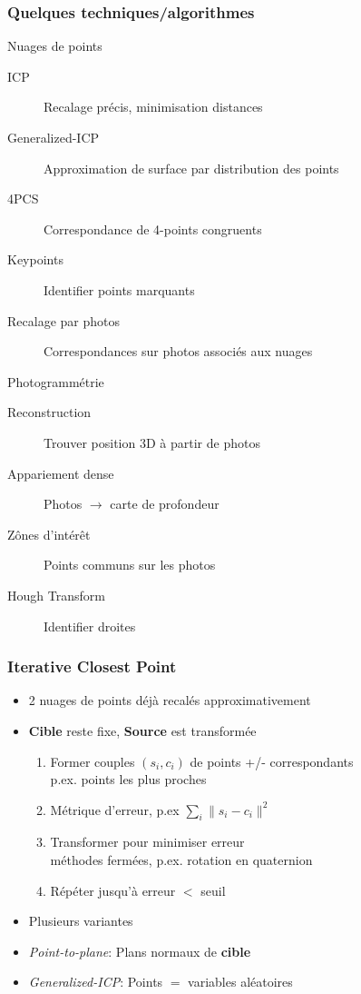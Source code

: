 \documentclass{beamer}
\begin{document}
\begin{frame}
\frametitle{Quelques techniques/algorithmes}
	\begin{block}{Nuages de points}
		\begin{description}
		\item[ICP] Recalage précis, minimisation distances
		\item[Generalized-ICP] Approximation de surface par distribution des points
		\item[4PCS] Correspondance de 4-points congruents
		\item[Keypoints] Identifier points marquants
		\item[Recalage par photos] Correspondances sur photos associés aux nuages
		\end{description}	
	\end{block}
	
	\begin{block}{Photogrammétrie}
		\begin{description}
		\item[Reconstruction] Trouver position 3D à partir de photos
		\item[Appariement dense] Photos $\rightarrow$ carte de profondeur
		\item[Zônes d'intérêt] Points communs sur les photos
		\item[Hough Transform] Identifier droites
		\end{description}
	\end{block}
\end{frame}

\begin{frame}
\frametitle{Iterative Closest Point {\footnotesize \cite{Besl1992}}}
	\begin{itemize}
	\item 2 nuages de points déjà recalés approximativement
	\item \textbf{Cible} reste fixe, \textbf{Source} est transformée \\
		\begin{enumerate}
		\item Former couples $(s_i, c_i)$ de points +/- correspondants
			\\ p.ex. points les plus proches
		\item Métrique d'erreur, p.ex $\sum_i \| s_i - c_i \|^2$
		\item Transformer  pour minimiser erreur
			\\ méthodes fermées, p.ex. rotation en quaternion
		\item Répéter jusqu'à erreur $<$ seuil
		\end{enumerate}
	\item Plusieurs variantes {\footnotesize \cite{Rusi2001}}
	\item \emph{Point-to-plane}: Plans normaux de \textbf{cible}
	\item \emph{Generalized-ICP}: Points $=$ variables aléatoires {\footnotesize \cite{Sega2009}}
	\end{itemize}
\end{frame}
\end{document}
